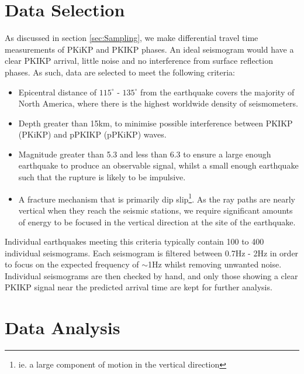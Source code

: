 \documentclass[11pt,a4paper]{article}
\begin{document}
\section{Data Selection}
\label{sec:Data}
As discussed in section \ref{sec:Sampling}, we make differential travel time measurements of PKiKP and PKIKP phases. An ideal seismogram would have a clear PKIKP arrival, little noise and no interference from surface reflection phases. As such, data are selected to meet the following criteria:

\begin{itemize}
	\item Epicentral distance of $115^{\circ}$ - $135^{\circ}$ from the earthquake covers the majority of North America, where there is the highest worldwide density of seismometers.
	\item  Depth greater than 15km, to minimise possible interference between PKIKP (PKiKP) and pPKIKP (pPKiKP) waves.
	\item Magnitude greater than 5.3 and less than 6.3 to ensure a large enough earthquake to produce an observable signal, whilst a small enough earthquake such that the rupture is likely to be impulsive.
	\item A fracture mechanism that is primarily dip slip\footnote{ie. a large component of motion in the vertical direction}. As the ray paths are nearly vertical when they reach the seismic stations, we require significant amounts of energy to be focused in the vertical direction at the site of the earthquake.
\end{itemize}

Individual earthquakes meeting this criteria typically contain 100 to 400 individual seismograms. Each seismogram is filtered between 0.7Hz - 2Hz in order to focus on the expected frequency of $\sim$1Hz whilst removing unwanted noise. Individual seismograms are then checked by hand, and only those showing a clear PKIKP signal near the predicted arrival time are kept for further analysis.

\section{Data Analysis}
\end{document}
